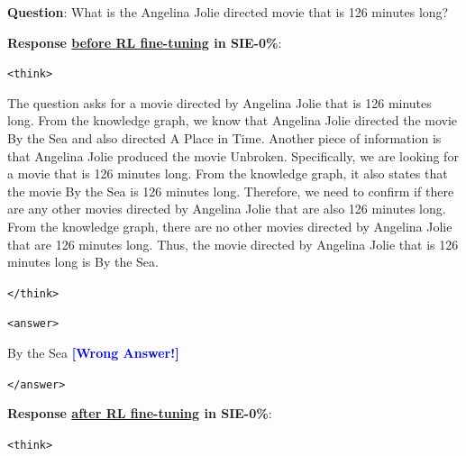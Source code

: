 \documentclass{article} %
\begin{document}
\label{appdx:d}

\begin{tcolorbox}[
  breakable,
  colback=gray!10,
  colframe=gray!60,
  title=Case study before and after RL fine-tuning in SIE,
  left=6pt,right=6pt,top=4pt,bottom=4pt,
  fontupper=\scriptsize
]
\textbf{Question}: What is the Angelina Jolie directed movie that is 126 minutes long?
\vspace{2pt}

\textbf{Response \underline{before RL fine-tuning} in SIE-0\%}:

\texttt{<think>}

The question asks for a movie directed by Angelina Jolie that is 126 minutes long.
From the knowledge graph, we know that Angelina Jolie directed the movie By the Sea and also directed A Place in Time.
Another piece of information is that Angelina Jolie produced the movie Unbroken.
Specifically, we are looking for a movie that is 126 minutes long. From the knowledge graph, it also states that the movie By the Sea is 126 minutes long.
Therefore, we need to confirm if there are any other movies directed by Angelina Jolie that are also 126 minutes long. From the knowledge graph, there are no other movies directed by Angelina Jolie that are 126 minutes long.
Thus, the movie directed by Angelina Jolie that is 126 minutes long is By the Sea.

\texttt{</think>}

\texttt{<answer>} 

By the Sea \quad \textcolor{blue}{\textbf{[Wrong Answer!]}}

\texttt{</answer>}
\vspace{2pt}

\textbf{Response \underline{after RL fine-tuning} in SIE-0\%}:

\texttt{<think>}


\end{tcolorbox}
\end{document}
